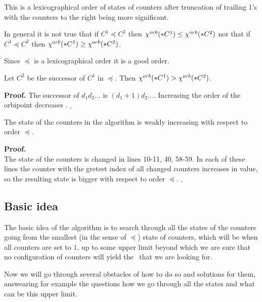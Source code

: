 This is a lexicographical order 
of states of counters after truncation of trailing 1's 
with the counters to the right being more significant. 

\begin{observation}
In general it is not true that if $C^1 \preceq C^2$ then 
${\chi^{orb}(*C^1)} \leq {\chi^{orb}(*C^2)}$ nor that if $C^1 \preceq C^2$ then 
${\chi^{orb}(*C^1)} \geq {\chi^{orb}(*C^2)}$.
\end{observation}

\begin{observation}
Since $\preceq$ is a lexicographical order it is a good order. 
\end{observation}

\begin{observation}\label{Successor lemma}
Let $C^2$ be the successor of $C^1$ in $\preceq$. Then ${\chi^{orb}(*C^1)} > {\chi^{orb}(*C^2)}$.
\end{observation}
\textbf{Proof.}
The successor of $d_1d_2\dots$ is $(d_1+1)d_2\dots$. Increasing the order of the orbipoint  
decreases \Eoc. $_\square$



\begin{lemma}
The state of the counters in the algorithm is weakly increasing with respect to order $\preceq$. 
\end{lemma}
\textbf{Proof.} \\
The state of the counters is changed in lines 10-11, 40, 58-59. In each of these lines 
the counter with the gretest index of all changed counters increases in value, so 
the resulting state is bigger with respect to order $\preceq$. $_\square$

\subsection{Basic idea}
The basic idea of the algorithm is to search through all the states of the counters going 
from the smallest (in the sense of $\preceq$) state of counters, which will be when all counters 
are set to $1$, up to some upper limit beyond which we are sure that no configuration of 
counters will yield the \Eoc\ that we are looking for. 

Now we will go through several obstacles of how to do so and solutions for them, answearing for 
example the 
questions how we go through all the states and what can be this upper limit. 

